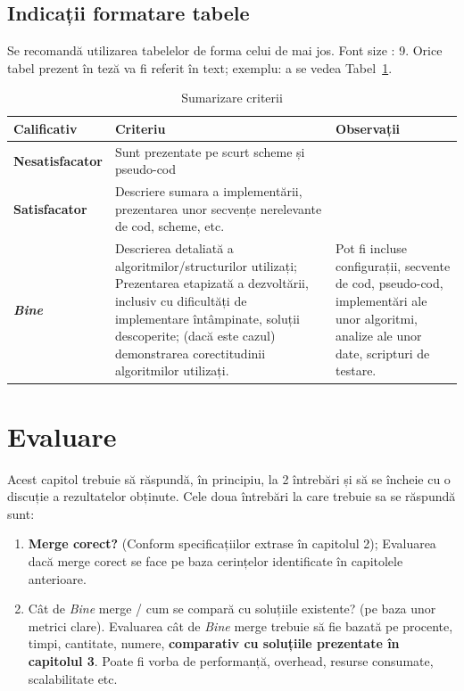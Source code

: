 \section{Indicații formatare tabele}
Se recomandă utilizarea tabelelor de forma celui de mai jos.  Font size :  9. 
Orice tabel prezent în teză va fi referit în text; exemplu: a se vedea Tabel~\ref{tab:criterii}.

\begin{table}[th]\small\linespread{1}
\caption{Sumarizare criterii}
\label{tab:criterii}
\begin{tabular}{l >{\raggedright\arraybackslash}p{8cm} >{\raggedright\arraybackslash}p{4cm}}
\textbf{Calificativ} & \textbf{Criteriu} & \textbf{Observații} \\\hline
\textbf{Nesatisfacator} & Sunt prezentate pe scurt scheme și pseudo-cod & \\\hline
\textbf{Satisfacator} &Descriere sumara a implementării, prezentarea unor secvențe nerelevante de cod, scheme, etc.& \\
\hline
\textbf{\textit{Bine}} &Descrierea detaliată a algoritmilor/structurilor utilizați; Prezentarea etapizată a dezvoltării, inclusiv cu dificultăți de implementare întâmpinate, soluții descoperite; (dacă este cazul) demonstrarea corectitudinii algoritmilor utilizați. & Pot fi incluse configurații, secvente de cod, pseudo-cod, implementări ale unor algoritmi, analize ale unor date, scripturi de testare. \\
\hline
\end{tabular}
\end{table}


\chapter{Evaluare}
Acest capitol trebuie să răspundă, în principiu, la 2 întrebări și să se încheie cu o discuție a rezultatelor obținute. Cele doua întrebări la care trebuie sa se răspundă sunt:
\begin{enumerate}
	\item  \textbf{Merge corect?} (Conform specificațiilor extrase în capitolul 2); 
Evaluarea dacă merge corect se face pe baza cerințelor identificate în capitolele anterioare. 

	\item Cât de \textit{Bine} merge / cum se compară cu soluțiile existente? (pe baza unor metrici clare). 
Evaluarea cât de \textit{Bine} merge trebuie să fie bazată pe procente, timpi, cantitate, numere, \textbf{comparativ cu soluțiile prezentate în capitolul 3}. Poate fi vorba de performanță, overhead, resurse consumate, scalabilitate etc. 
\end{enumerate}


